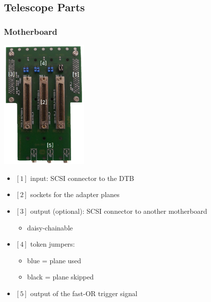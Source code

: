 \documentclass[9pt]{beamer}
\begin{document}
\subsection*{Telescope Parts}
\begin{frame}
	\frametitle{Motherboard}
	\begin{center}
		\begin{minipage}{4.6cm}
			\centering
			\includegraphics[width=4.35cm]{Pics/Motherboard}
		\end{minipage}
		\hspace*{2pt}
		\begin{minipage}[c][.7\textheight]{6cm}
			\begin{itemize}
				\setlength{\itemsep}{\fill}
				\item $[1]$ input: SCSI connector to the DTB
				\item $[2]$ sockets for the adapter planes
				\item $[3]$ output (optional): SCSI connector to another motherboard
				\begin{itemize}
					\item daisy-chainable
				\end{itemize}
				\item $[4]$ token jumpers:
				\begin{itemize}
					\item blue\hspace{4pt} = plane used
					\item black = plane skipped
				\end{itemize}
				\item $[5]$ output of the fast-OR trigger signal 
			\end{itemize}
		\end{minipage}\no\s
	\end{center}
\end{frame}
\end{document}

